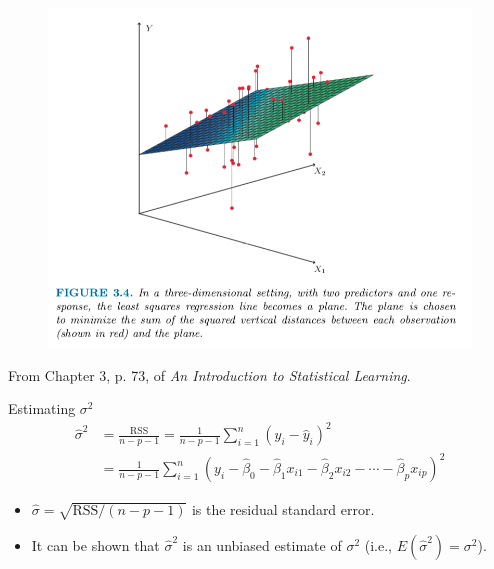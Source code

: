 \documentclass[10pt]{beamer}
\begin{document}
\begin{frame}
\begin{figure}
\includegraphics[scale=0.3]{figure/planeISLR.png}
\end{figure}
\scriptsize
From Chapter 3, p. 73, of \emph{An Introduction to Statistical Learning}.
\end{frame}

\begin{frame}{Estimating $\sigma^2$}
\begin{align*}
\hat{\sigma}^2 &= \frac{\text{RSS}}{n-p-1} = \frac{1}{n-p-1} \sum_{i=1}^n (y_i - \hat{y}_i)^2\\
&= \frac{1}{n-p-1} \sum_{i=1}^n (y_i - \hat{\beta}_0 - \hat{\beta}_1 x_{i1} - \hat{\beta}_2 x_{i2} -  \cdots - \hat{\beta}_p x_{ip})^2 
\end{align*}
\begin{itemize}
\item $\hat{\sigma} = \sqrt{\text{RSS} / (n-p-1)}$ is the residual standard error.
\vspace{5pt}
\item It can be shown that $\hat{\sigma}^2$ is an unbiased estimate of $\sigma^2$ (i.e., $E(\hat{\sigma}^2) = \sigma^2$).
\end{itemize}
\end{frame}
\end{document}
